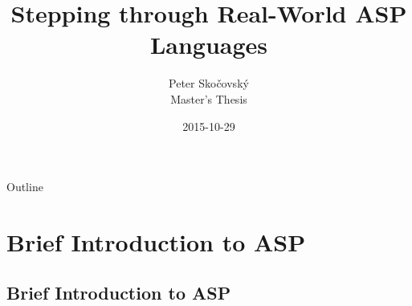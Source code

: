 \documentclass[trans,draft]{beamer} %
\title[Stepping through ASP]
{Stepping through Real-World ASP Languages}
\author[P. Skočovský]
{
	Peter Skočovský\\
	\scriptsize
	Master's Thesis
}
\date
{2015-10-29}
\begin{document}
\begin{frame}
	\titlepage
\end{frame}

\begin{frame}{Outline}
	\tableofcontents
\end{frame}

% 
% 	
% 	



\section{Brief Introduction to ASP}


\subsection{Brief Introduction to ASP}
\end{document}
